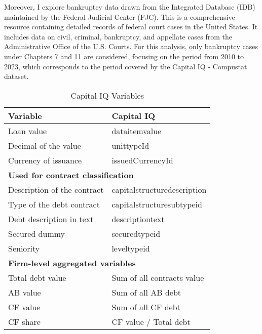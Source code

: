 \documentclass[12pt]{article}
\begin{document}
Moreover, I explore bankruptcy data drawn from the Integrated Database (IDB) maintained by the Federal Judicial Center (FJC). This is a comprehensive resource containing detailed records of federal court cases in the United States. It includes data on civil, criminal, bankruptcy, and appellate cases from the Administrative Office of the U.S. Courts. For this analysis, only bankruptcy cases under Chapters 7 and 11 are considered, focusing on the period from 2010 to 2023, which corresponds to the period covered by the Capital IQ - Compustat dataset. 

\begin{table}[htbp]    

    \centering
    \caption{Capital IQ Variables}
    \label{tab:CAPIQ}
    \begin{tabular}{ll}
    \toprule
    Variable & Capital IQ \\
    \midrule
    Loan value & dataitemvalue \\
    Decimal of the value & unittypeId \\
    Currency of issuance & issuedCurrencyId \vspace{3mm} \\
    \multicolumn{2}{l}{\textbf{Used for contract classification}} \\
    Description of the contract & capitalstructuredescription \\
    Type of the debt contract & capitalstructuresubtypeid \\
    Debt description in text & descriptiontext \\
    Secured dummy & securedtypeid \\
    Seniority & leveltypeid \vspace{3mm} \\
    \multicolumn{2}{l}{\textbf{Firm-level aggregated variables}} \\
    Total debt value & Sum of all contracts value \\
    AB value & Sum of all AB debt \\
    CF value & Sum of all CF debt \\
    CF share & CF value / Total debt \\
    \bottomrule
    \end{tabular}
\end{table}
\end{document}
